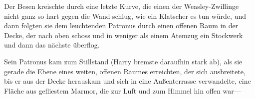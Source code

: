 Der Besen kreischte durch eine letzte Kurve, die einen der Weasley-Zwillinge nicht ganz so hart gegen die Wand schlug, wie ein Klatscher es tun würde, und dann folgten sie dem leuchtenden Patronus durch einen offenen Raum in der Decke, der nach oben schoss und in weniger als einem Atemzug ein Stockwerk und dann das nächste überflog.

Sein Patronus kam zum Stillstand (Harry bremste daraufhin stark ab), als sie gerade die Ebene eines weiten, offenen Raumes erreichten, der sich ausbreitete, bis er aus der Decke herauskam und sich in eine Außenterrasse verwandelte, eine Fläche aus gefliestem Marmor, die zur Luft und zum Himmel hin offen war—


